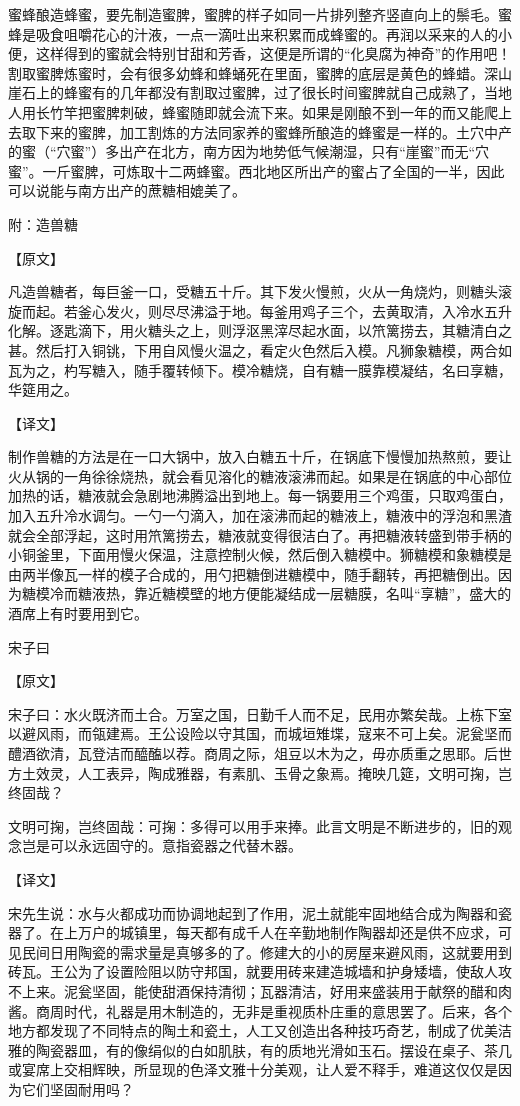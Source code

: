 \documentclass[12pt,UTF8]{ctexbook}
\begin{document}
蜜蜂酿造蜂蜜，要先制造蜜脾，蜜脾的样子如同一片排列整齐竖直向上的鬃毛。蜜蜂是吸食咀嚼花心的汁液，一点一滴吐出来积累而成蜂蜜的。再润以采来的人的小便，这样得到的蜜就会特别甘甜和芳香，这便是所谓的“化臭腐为神奇”的作用吧！割取蜜脾炼蜜时，会有很多幼蜂和蜂蛹死在里面，蜜脾的底层是黄色的蜂蜡。深山崖石上的蜂蜜有的几年都没有割取过蜜脾，过了很长时间蜜脾就自己成熟了，当地人用长竹竿把蜜脾刺破，蜂蜜随即就会流下来。如果是刚酿不到一年的而又能爬上去取下来的蜜脾，加工割炼的方法同家养的蜜蜂所酿造的蜂蜜是一样的。土穴中产的蜜（“穴蜜”）多出产在北方，南方因为地势低气候潮湿，只有“崖蜜”而无“穴蜜”。一斤蜜脾，可炼取十二两蜂蜜。西北地区所出产的蜜占了全国的一半，因此可以说能与南方出产的蔗糖相媲美了。

附：造兽糖

【原文】

凡造兽糖者，每巨釜一口，受糖五十斤。其下发火慢煎，火从一角烧灼，则糖头滚旋而起。若釜心发火，则尽尽沸溢于地。每釜用鸡子三个，去黄取清，入冷水五升化解。逐匙滴下，用火糖头之上，则浮沤黑滓尽起水面，以笊篱捞去，其糖清白之甚。然后打入铜铫，下用自风慢火温之，看定火色然后入模。凡狮象糖模，两合如瓦为之，杓写糖入，随手覆转倾下。模冷糖烧，自有糖一膜靠模凝结，名曰享糖，华筵用之。

【译文】

制作兽糖的方法是在一口大锅中，放入白糖五十斤，在锅底下慢慢加热熬煎，要让火从锅的一角徐徐烧热，就会看见溶化的糖液滚沸而起。如果是在锅底的中心部位加热的话，糖液就会急剧地沸腾溢出到地上。每一锅要用三个鸡蛋，只取鸡蛋白，加入五升冷水调匀。一勺一勺滴入，加在滚沸而起的糖液上，糖液中的浮泡和黑渣就会全部浮起，这时用笊篱捞去，糖液就变得很洁白了。再把糖液转盛到带手柄的小铜釜里，下面用慢火保温，注意控制火候，然后倒入糖模中。狮糖模和象糖模是由两半像瓦一样的模子合成的，用勺把糖倒进糖模中，随手翻转，再把糖倒出。因为糖模冷而糖液热，靠近糖模壁的地方便能凝结成一层糖膜，名叫“享糖”，盛大的酒席上有时要用到它。

宋子曰

【原文】

宋子曰：水火既济而土合。万室之国，日勤千人而不足，民用亦繁矣哉。上栋下室以避风雨，而瓴建焉。王公设险以守其国，而城垣雉堞，寇来不可上矣。泥瓮坚而醴酒欲清，瓦登洁而醯醢以荐。商周之际，俎豆以木为之，毋亦质重之思耶。后世方土效灵，人工表异，陶成雅器，有素肌、玉骨之象焉。掩映几筵，文明可掬，岂终固哉？

文明可掬，岂终固哉：可掬：多得可以用手来捧。此言文明是不断进步的，旧的观念岂是可以永远固守的。意指瓷器之代替木器。

【译文】

宋先生说：水与火都成功而协调地起到了作用，泥土就能牢固地结合成为陶器和瓷器了。在上万户的城镇里，每天都有成千人在辛勤地制作陶器却还是供不应求，可见民间日用陶瓷的需求量是真够多的了。修建大的小的房屋来避风雨，这就要用到砖瓦。王公为了设置险阻以防守邦国，就要用砖来建造城墙和护身矮墙，使敌人攻不上来。泥瓮坚固，能使甜酒保持清彻；瓦器清洁，好用来盛装用于献祭的醋和肉酱。商周时代，礼器是用木制造的，无非是重视质朴庄重的意思罢了。后来，各个地方都发现了不同特点的陶土和瓷土，人工又创造出各种技巧奇艺，制成了优美洁雅的陶瓷器皿，有的像绢似的白如肌肤，有的质地光滑如玉石。摆设在桌子、茶几或宴席上交相辉映，所显现的色泽文雅十分美观，让人爱不释手，难道这仅仅是因为它们坚固耐用吗？
\end{document}
